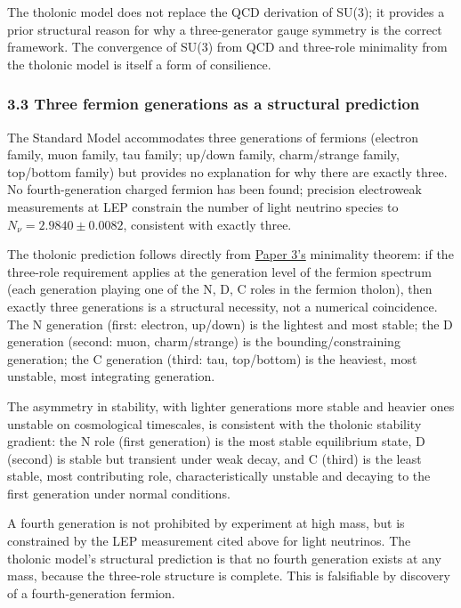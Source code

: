 \documentclass[
  11pt,
  letterpaper,
]{article}
\begin{document}
The tholonic model does not replace the QCD derivation of SU(3); it
provides a prior structural reason for why a three-generator gauge
symmetry is the correct framework. The convergence of SU(3) from QCD and
three-role minimality from the tholonic model is itself a form of
consilience.

\subsubsection{3.3 Three fermion generations as a structural
prediction}\label{three-fermion-generations-as-a-structural-prediction}

The Standard Model accommodates three generations of fermions (electron
family, muon family, tau family; up/down family, charm/strange family,
top/bottom family) but provides no explanation for why there are exactly
three. No fourth-generation charged fermion has been found; precision
electroweak measurements at LEP constrain the number of light neutrino
species to \(N_\nu = 2.9840 \pm 0.0082\), consistent with exactly three.

The tholonic prediction follows directly from
\href{https://github.com/baardev/truevalue/blob/main/docnav/Research/papers/3_minimal-recursive-triadic-framework/3_minimal-recursive-triadic-framework.pdf}{Paper
3's} minimality theorem: if the three-role requirement applies at the
generation level of the fermion spectrum (each generation playing one of
the N, D, C roles in the fermion tholon), then exactly three generations
is a structural necessity, not a numerical coincidence. The N generation
(first: electron, up/down) is the lightest and most stable; the D
generation (second: muon, charm/strange) is the bounding/constraining
generation; the C generation (third: tau, top/bottom) is the heaviest,
most unstable, most integrating generation.

The asymmetry in stability, with lighter generations more stable and
heavier ones unstable on cosmological timescales, is consistent with the
tholonic stability gradient: the N role (first generation) is the most
stable equilibrium state, D (second) is stable but transient under weak
decay, and C (third) is the least stable, most contributing role,
characteristically unstable and decaying to the first generation under
normal conditions.

A fourth generation is not prohibited by experiment at high mass, but is
constrained by the LEP measurement cited above for light neutrinos. The
tholonic model's structural prediction is that no fourth generation
exists at any mass, because the three-role structure is complete. This
is falsifiable by discovery of a fourth-generation fermion.
\end{document}
